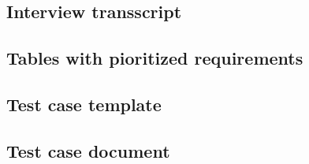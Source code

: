 \documentclass[paper=a4, fontsize=11pt,twoside]{scrartcl}	%
\begin{document}
\subsection{Interview transscript}


\subsection{Tables with pioritized requirements}


\subsection{Test case template}


\subsection{Test case document}

\end{document}
